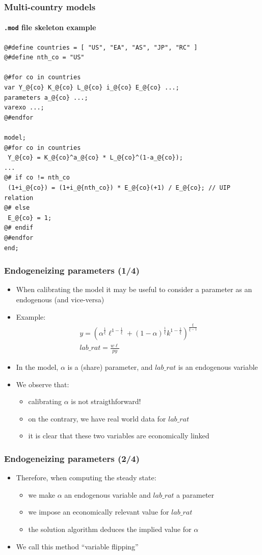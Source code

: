 \documentclass{beamer}
\begin{document}
\begin{frame}[fragile=singleslide]
  \frametitle{Multi-country models}
  \framesubtitle{\texttt{.mod} file skeleton example}
  \scriptsize
\begin{verbatim}
@#define countries = [ "US", "EA", "AS", "JP", "RC" ]
@#define nth_co = "US"

@#for co in countries
var Y_@{co} K_@{co} L_@{co} i_@{co} E_@{co} ...;
parameters a_@{co} ...;
varexo ...;
@#endfor

model;
@#for co in countries
 Y_@{co} = K_@{co}^a_@{co} * L_@{co}^(1-a_@{co});
...
@# if co != nth_co
 (1+i_@{co}) = (1+i_@{nth_co}) * E_@{co}(+1) / E_@{co}; // UIP relation
@# else
 E_@{co} = 1;
@# endif
@#endfor
end;
\end{verbatim}
  \normalsize
\end{frame}

\begin{frame}
  \frametitle{Endogeneizing parameters (1/4)}
  \begin{itemize}
  \item When calibrating the model it may be useful to consider a parameter as an endogenous (and vice-versa)
  \item Example:
    \begin{gather*}
      y = \left(\alpha^{\frac{1}{\xi}} \ell^{1-\frac{1}{\xi}} + (1-\alpha)^{\frac{1}{\xi}}k^{1-\frac{1}{\xi}}\right)^{\frac{\xi}{\xi - 1}} \\
      lab\_rat = \frac{w \ell}{p y}
    \end{gather*}
  \item In the model, $\alpha$ is a (share) parameter, and $lab\_rat$ is an endogenous variable
  \item We observe that:
    \begin{itemize}
    \item calibrating $\alpha$ is not straigthforward!
    \item on the contrary, we have real world data for $lab\_rat$
    \item it is clear that these two variables are economically linked
    \end{itemize}
  \end{itemize}
\end{frame}

\begin{frame}[fragile=singleslide]
  \frametitle{Endogeneizing parameters (2/4)}
  \begin{itemize}
  \item Therefore, when computing the steady state:
    \begin{itemize}
    \item we make $\alpha$ an endogenous variable and $lab\_rat$ a parameter
    \item we impose an economically relevant value for $lab\_rat$
    \item the solution algorithm deduces the implied value for $\alpha$
    \end{itemize}
  \item We call this method ``variable flipping''
  \end{itemize}
\end{frame}
\end{document}
